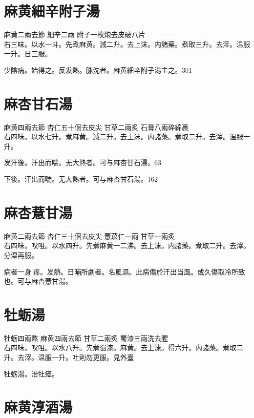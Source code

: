 \section{麻黄細辛附子湯}

麻黄{\scriptsize 二兩去節} 細辛{\scriptsize 二兩} 附子{\scriptsize 一枚炮去皮破八片}\\
右三味。以水一斗。先煮麻黄。減二升。去上沫。内諸藥。煮取三升。去滓。温服一升。日三服。

少陰病。始得之。反发熱。脉沈者。麻黄細辛附子湯主之。301

\section{麻杏甘石湯}

麻黄{\scriptsize 四兩去節} 杏仁{\scriptsize 五十個去皮尖} 甘草{\scriptsize 二兩炙} 石膏{\scriptsize 八兩碎綿裹}\\
右四味。以水七升。煮麻黄。減二升。去上沫。内諸藥。煮取二升。去滓。温服一升。

发汗後。汗出而喘。无大熱者。可与麻杏甘石湯。63

下後。汗出而喘。无大熱者。可与麻杏甘石湯。162

\section{麻杏薏甘湯}

麻黄{\scriptsize 二兩去節} 杏仁{\scriptsize 三十個去皮尖} 薏苡仁{\scriptsize 一兩} 甘草{\scriptsize 一兩炙}\\
右四味。㕮咀。以水四升。先煮麻黄一二沸。去上沫。内諸藥。煮取二升。去滓。分温再服。

病者一身{\sungtpii 𥁞}疼。发熱。日晡所劇者。名風濕。此病傷於汗出当風。或久傷取冷所致也。可与麻杏薏甘湯。

\section{牡蛎湯}

牡蛎{\scriptsize 四兩熬} 麻黄{\scriptsize 四兩去節} 甘草{\scriptsize 二兩炙} 蜀漆{\scriptsize 三兩洗去腥}\\
右四味。㕮咀。以水八升。先煮蜀漆。麻黄。去上沫。得六升。内諸藥。煮取二升。去滓。温服一升。吐則勿更服。{\scriptsize 見外臺}

牡蛎湯。治牡瘧。

\section{麻黄淳酒湯}


